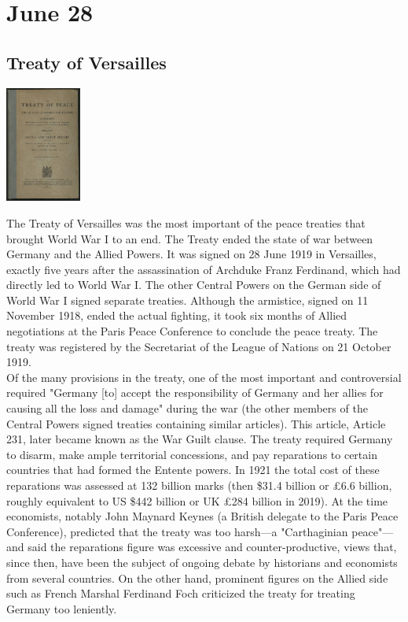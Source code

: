 \documentclass[11pt]{report}
\begin{document}
\section{June 28}
\subsection{Treaty of Versailles}
\vspace{2mm}\begin{center}\includegraphics[width=2.5cm]{./img/treatyOfVersailles.jpg}\end{center}
The Treaty of Versailles was the most important of the peace treaties that brought World War I to an end. The Treaty ended the state of war between Germany and the Allied Powers. It was signed on 28 June 1919 in Versailles, exactly five years after the assassination of Archduke Franz Ferdinand, which had directly led to World War I. The other Central Powers on the German side of World War I signed separate treaties. Although the armistice, signed on 11 November 1918, ended the actual fighting, it took six months of Allied negotiations at the Paris Peace Conference to conclude the peace treaty. The treaty was registered by the Secretariat of the League of Nations on 21 October 1919.\\
\indent Of the many provisions in the treaty, one of the most important and controversial required "Germany [to] accept the responsibility of Germany and her allies for causing all the loss and damage" during the war (the other members of the Central Powers signed treaties containing similar articles). This article, Article 231, later became known as the War Guilt clause. The treaty required Germany to disarm, make ample territorial concessions, and pay reparations to certain countries that had formed the Entente powers. In 1921 the total cost of these reparations was assessed at 132 billion marks (then \$31.4 billion or £6.6 billion, roughly equivalent to US \$442 billion or UK £284 billion in 2019). At the time economists, notably John Maynard Keynes (a British delegate to the Paris Peace Conference), predicted that the treaty was too harsh—a "Carthaginian peace"—and said the reparations figure was excessive and counter-productive, views that, since then, have been the subject of ongoing debate by historians and economists from several countries. On the other hand, prominent figures on the Allied side such as French Marshal Ferdinand Foch criticized the treaty for treating Germany too leniently.
\end{document}
